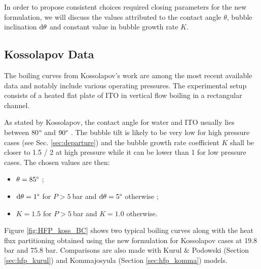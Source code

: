 \npar

In order to propose consistent choices required closing parameters for the new formulation, we will discuss the values attributed to the contact angle $\theta$, bubble inclination $\mathrm{d}\theta$ and constant value in bubble growth rate $K$.


\subsection{Kossolapov Data}
\label{subsec:HFP_verif_koss}

The boiling curves from Kossolapov's work \cite{kossolapov_experimental_2021} are among the most recent available data and notably include various operating pressures. The experimental setup consists of a heated flat plate of ITO in vertical flow boiling in a rectangular channel.


\npar

As stated by Kossolapov, the contact angle for water and ITO usually lies between 80$\degree$ and $90\degree$ \cite{kossolapov_experimental_2021}. The bubble tilt is likely to be very low for high pressure cases (see Sec. \ref{sec:departure}) and the bubble growth rate coefficient $K$ shall be closer to 1.5 / 2 at high pressure while it can be lower than 1 for low pressure cases. The chosen values are then:

\begin{itemize}
\item $\theta = 85 \degree$ ;
\item $\mathrm{d}\theta = 1 \degree$ for $P > 5\ $bar and $\mathrm{d}\theta = 5 \degree$ otherwise ;
\item $K = 1.5$ for $P > 5\ $bar and $K=1.0$ otherwise.
\end{itemize}


Figure \ref{fig:HFP_koss_BC} shows two typical boiling curves along with the heat flux partitioning obtained using the new formulation for Kossolapov cases at 19.8 bar and 75.8 bar. Comparisons are also made with Kurul \& Podowski (Section \ref{sec:hfp_kurul}) and Kommajosyula (Section \ref{sec:hfp_komma}) models.


